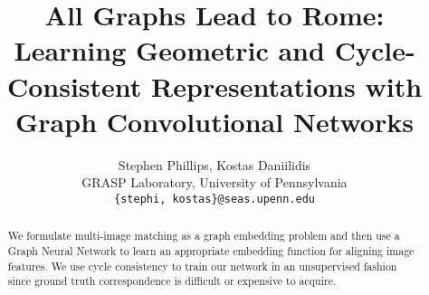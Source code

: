 \documentclass[10pt,twocolumn,letterpaper]{article}
\begin{document}
\title{All Graphs Lead to Rome: Learning Geometric and Cycle-Consistent Representations with Graph Convolutional Networks}

\author{Stephen Phillips, Kostas Daniilidis \\
GRASP Laboratory, University of Pennsylvania\\
{\tt\small \{stephi, kostas\}@seas.upenn.edu}
}



\maketitle

\begin{abstract}
    We formulate multi-image matching as a graph embedding problem and then use a Graph Neural Network to learn an appropriate embedding function for aligning image features.
    We use cycle consistency to train our network in an unsupervised fashion since ground truth correspondence is difficult or expensive to acquire.
\end{abstract}
\vspace{-1em}
\end{document}
